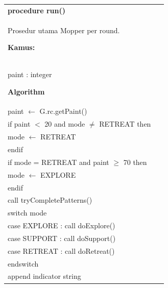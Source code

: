 \documentclass{article}
\newenvironment{pseudobox}
{
\centering
\begin{longtable}{|p{0.94\linewidth}|}
\hline
}
{
\\ \hline
\end{longtable}
\vspace{0.05cm}
}
\begin{document}
\begin{pseudobox}
\textbf{procedure run()} \\
{ Prosedur utama Mopper per round. }

\textbf{Kamus:} \\
\hspace*{1em} paint : integer

\textbf{Algorithm} \\
\hspace*{1em} paint $\leftarrow$ G.rc.getPaint() \\

\hspace*{1em} if paint $<$ 20 and mode $\neq$ RETREAT then \\
\hspace*{2em} mode $\leftarrow$ RETREAT \\
\hspace*{1em} endif \\

\hspace*{1em} if mode = RETREAT and paint $\geq$ 70 then \\
\hspace*{2em} mode $\leftarrow$ EXPLORE \\
\hspace*{1em} endif \\

\hspace*{1em} call tryCompletePatterns() \\

\hspace*{1em} switch mode \\
\hspace*{2em} case EXPLORE : call doExplore() \\
\hspace*{2em} case SUPPORT : call doSupport() \\
\hspace*{2em} case RETREAT : call doRetreat() \\
\hspace*{1em} endswitch \\

\hspace*{1em} append indicator string
\end{pseudobox}
\end{document}
